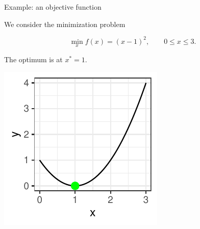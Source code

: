 \begin{frame}[allowframebreaks]{Example: an objective function}

We consider the minimization problem

$$
\min_{x} f(x) = (x - 1)^2, \qquad 0 \le x \le 3.
$$

The optimum is at $x^* = 1$.

\vspace*{0.1cm}


\centering \includegraphics[width=\maxwidth,height=0.5\textheight]{images/expedia-6-1}


\end{frame}

